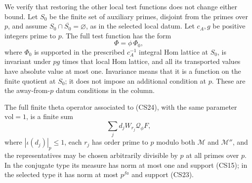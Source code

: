 We verify that restoring the other local test functions does
not change either bound.  Let $S_0$ be the finite set of
auxiliary primes, disjoint from the primes over $p$, and
assume $S_0\cap\overline{S_0}=\varnothing$, as in the
selected local datum.  Let $c_A,g$ be positive integers
prime to $p$.
The full test function has the form
\[
                              \Phi=\phi\,\Phi_0,             \tag{CS24}
\]
where $\Phi_0$ is supported in the prescribed
$c_A^{-1}$ integral Hom lattice at $S_0$, is invariant under
$pg$ times that local Hom lattice, and all its transported
values have absolute value at most one.  Invariance means
that it is a function on the finite quotient at $S_0$;
it does not impose an additional condition at $p$.
These are the away-from-$p$ datum conditions in the column.

\begin{lemma}\label{csp-other-primes}
The full finite theta operator associated to (CS24), with
the same parameter $\mathrm{vol}=1$, is a finite sum
\[
                           \sum_j d_jW_{r_j}\mathcal Q_\phi F,
                                                               \tag{CS25}
\]
where $|\iota(d_j)|_p\le1$, each $r_j$ has order prime to
$p$ modulo both $\mathcal M$ and $\mathcal M''$, and the
representatives may be chosen arbitrarily divisible by $p$
at all primes over $p$.  In the conjugate type its measure
has norm at most one and support (CS15); in the selected
type it has norm at most $p^{fa}$ and support (CS23).
\end{lemma}
